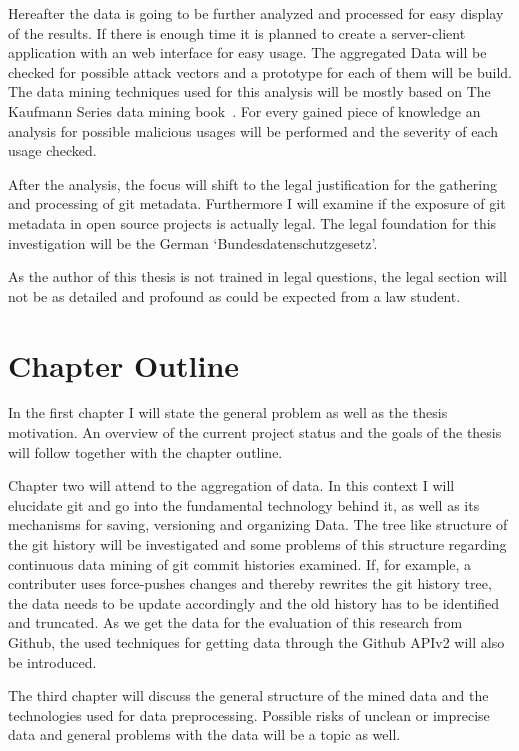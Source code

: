 Hereafter the data is going to be further analyzed and processed for easy display of the results.
If there is enough time it is planned to create a server-client application with an web interface for easy usage.
The aggregated Data will be checked for possible attack vectors and a prototype for each of them will be build.
The data mining techniques used for this analysis will be mostly based on The Kaufmann Series data mining book~\cite{book:data-mining}.
For every gained piece of knowledge an analysis for possible malicious usages will be performed and the severity of each usage checked.

After the analysis, the focus will shift to the legal justification for the gathering and processing of git metadata.
Furthermore I will examine if the exposure of git metadata in open source projects is actually legal.
The legal foundation for this investigation will be the German `Bundesdatenschutzgesetz'.

As the author of this thesis is not trained in legal questions, the legal section will not be as detailed and profound as could be expected from a law student.

\chapter{Chapter Outline}

In the first chapter I will state the general problem as well as the thesis motivation.
An overview of the current project status and the goals of the thesis will follow together with the chapter outline.

Chapter two will attend to the aggregation of data. In this context I will elucidate git and go into the fundamental technology behind it, as well as its mechanisms for saving, versioning and organizing Data.
The tree like structure of the git history will be investigated and some problems of this structure regarding continuous data mining of git commit histories examined.
If, for example, a contributer uses force-pushes changes and thereby rewrites the git history tree, the data needs to be update accordingly and the old history has to be identified and truncated.
As we get the data for the evaluation of this research from Github, the used techniques for getting data through the Github APIv2 will also be introduced.

The third chapter will discuss the general structure of the mined data and the technologies used for data preprocessing.
Possible risks of unclean or imprecise data and general problems with the data will be a topic as well.

